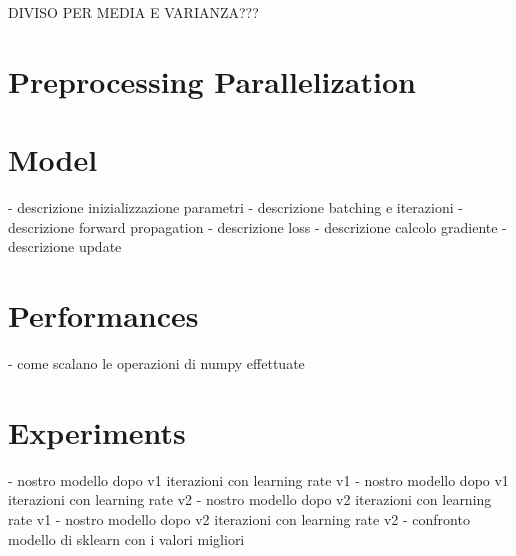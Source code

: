 \documentclass[
	letterpaper, %
	10pt, %
]{class}
\begin{document}
DIVISO PER MEDIA E VARIANZA???



\section{Preprocessing Parallelization}


\section{Model}

- descrizione inizializzazione parametri
- descrizione batching e iterazioni
- descrizione forward propagation
- descrizione loss
- descrizione calcolo gradiente
- descrizione update


\section{Performances}

- come scalano le operazioni di numpy effettuate


\section{Experiments}

- nostro modello dopo v1 iterazioni con learning rate v1
- nostro modello dopo v1 iterazioni con learning rate v2
- nostro modello dopo v2 iterazioni con learning rate v1
- nostro modello dopo v2 iterazioni con learning rate v2
- confronto modello di sklearn con i valori migliori

\end{document}
